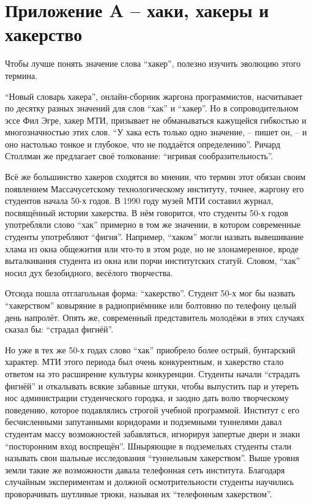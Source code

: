 
\chapter{Приложение A -- хаки, хакеры и хакерство} \label{Appendix A}

Чтобы лучше понять значение слова ``хакер'', полезно изучить эволюцию этого термина.

``Новый словарь хакера'', онлайн-сборник жаргона программистов, насчитывает по десятку разных значений для слов ``хак'' и ``хакер''. Но в сопроводительном эссе Фил Эгре, хакер МТИ, призывает не обманываться кажущейся гибкостью и многозначностью этих слов. ``У хака есть только одно значение, -- пишет он, -- и оно настолько тонкое и глубокое, что не поддаётся определению''. Ричард Столлман же предлагает своё толкование: ``игривая сообразительность''.

Всё же большинство хакеров сходятся во мнении, что термин этот обязан своим появлением Массачусетскому технологическому институту, точнее, жаргону его студентов начала 50-х годов. В 1990 году музей МТИ составил журнал, посвящённый истории хакерства. В нём говорится, что студенты 50-х годов употребляли слово ``хак'' примерно в том же значении, в котором современные студенты употребляют ``фигня''. Например, ``хаком'' могли назвать вывешивание хлама из окна общежития или что-то в этом роде, но не злонамеренное, вроде выталкивания студента из окна или порчи институтских статуй. Словом, ``хак'' носил дух безобидного, весёлого творчества.

Отсюда пошла отглагольная форма: ``хакерство''. Студент 50-х мог бы назвать ``хакерством'' ковыряние в радиоприёмнике или болтовню по телефону целый день напролёт. Опять же, современный представитель молодёжи в этих случаях сказал бы: ``страдал фигнёй''.

Но уже в тех же 50-х годах слово ``хак'' приобрело более острый, бунтарский характер. МТИ этого периода был очень конкурентным, и хакерство стало ответом на это расширение культуры конкуренции. Студенты начали ``страдать фигнёй'' и откалывать всякие забавные штуки, чтобы выпустить пар и утереть нос администрации студенческого городка, и заодно дать волю творческому поведению, которое подавлялись строгой учебной программой. Институт с его бесчисленными запутанными коридорами и подземными туннелями давал студентам массу возможностей забавляться, игнорируя запертые двери и знаки ``посторонним вход воспрещён''. Шныряющие в подземельях студенты стали называть свои шальные исследования ``туннельным хакерством''. Выше уровня земли такие же возможности давала телефонная сеть института. Благодаря случайным экспериментам и должной осмотрительности студенты научились проворачивать шутливые трюки, называя их ``телефонным хакерством''.

